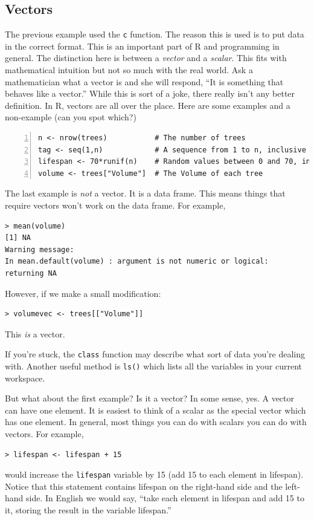 \documentclass[12pt]{article}
\begin{document}
\subsection{Vectors}
The previous example used the \verb|c| function. The reason this is used is to put data in the correct format. This is an important part of R and programming in general. The distinction here is between a \emph{vector} and a \emph{scalar}. This fits with mathematical intuition but not so much with the real world. Ask a mathematician what a vector is and she will respond, ``It is something that behaves like a vector.'' While this is sort of a joke, there really isn't any better definition. In R, vectors are all over the place. Here are some examples and a non-example (can you spot which?)
\begin{Verbatim}[frame=single, fontsize=\small, numbers=left]
n <- nrow(trees)           # The number of trees
tag <- seq(1,n)            # A sequence from 1 to n, inclusive
lifespan <- 70*runif(n)    # Random values between 0 and 70, inclusive
volume <- trees["Volume"]  # The Volume of each tree
\end{Verbatim}

The last example is \emph{not} a vector. It is a data frame. This means things that require vectors won't work on the data frame. For example,
\begin{Verbatim}[frame=single, fontsize=\small]
> mean(volume)
[1] NA
Warning message:
In mean.default(volume) : argument is not numeric or logical: returning NA
\end{Verbatim}
However, if we make a small modification:
\begin{verbatim}
> volumevec <- trees[["Volume"]]
\end{verbatim}
This \emph{is} a vector.

If you're stuck, the \verb|class| function may describe what sort of data you're dealing with. Another useful method is \verb|ls()| which lists all the variables in your current workspace.

But what about the first example? Is it a vector? In some sense, yes. A vector can have one element. It is easiest to think of a scalar as the special vector which has one element. In general, most things you can do with scalars you can do with vectors. For example,
\begin{verbatim}
> lifespan <- lifespan + 15
\end{verbatim}
would increase the \verb|lifespan| variable by 15 (add 15 to each element in lifespan). Notice that this statement contains lifespan on the right-hand side and the left-hand side. In English we would say, ``take each element in lifespan and add 15 to it, storing the result in the variable lifespan.''\
\end{document}
